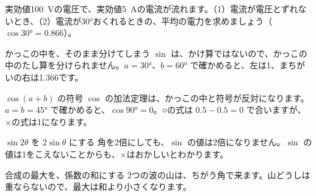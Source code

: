 \begin{jibun}
実効値\qty{100}{V}の電圧で、実効値\qty{5}{A}の電流が流れます。（1）電流が電圧とずれないとき、（2）電流が30°おくれるときの、平均の電力を求めましょう（$\cos30°=0.866$）。
\end{jibun}


\begin{tsumazuki}{かっこの中を、そのまま分けてしまう}
$\sin$ は、かけ算ではないので、かっこの中のたし算を分けられません。$a=30°$、$b=60°$ で確かめると、左は1、まちがいの右は1.366です。
\end{tsumazuki}

\begin{tsumazuki}{$\cos(a+b)$ の符号}
$\cos$ の加法定理は、かっこの中と符号が反対になります。$a=b=45°$ で確かめると、$\cos90°=0$。○の式は $0.5-0.5=0$ で合いますが、×の式は1になります。
\end{tsumazuki}

\begin{tsumazuki}{$\sin2\theta$ を $2\sin\theta$ にする}
角を2倍にしても、$\sin$ の値は2倍になりません。$\sin$ の値は1をこえないことからも、×はおかしいとわかります。
\end{tsumazuki}

\begin{tsumazuki}{合成の最大を、係数の和にする}
2つの波の山は、ちがう角で来ます。山どうしは重ならないので、最大は和より小さくなります。
\end{tsumazuki}

